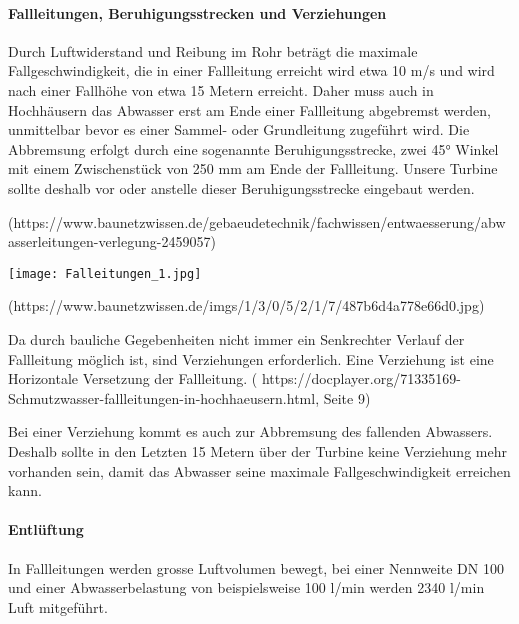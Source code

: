 \paragraph{Fallleitungen, Beruhigungsstrecken und Verziehungen}

Durch Luftwiderstand und Reibung im Rohr beträgt die maximale Fallgeschwindigkeit, die in einer Fallleitung erreicht wird etwa 10 m/s und wird nach einer Fallhöhe von etwa 15 Metern erreicht. Daher muss auch in Hochhäusern das Abwasser erst am Ende einer Fallleitung abgebremst werden, unmittelbar bevor es einer Sammel- oder Grundleitung zugeführt wird. Die Abbremsung erfolgt durch eine sogenannte Beruhigungsstrecke, zwei 45° Winkel mit einem Zwischenstück von 250 mm am Ende der Fallleitung. Unsere Turbine sollte deshalb vor oder anstelle dieser Beruhigungsstrecke eingebaut werden.

(https://www.baunetzwissen.de/gebaeudetechnik/fachwissen/entwaesserung/abwasserleitungen-verlegung-2459057)



\begin{center}

\texttt{[image: Falleitungen\_1.jpg]}

\end{center}

(https://www.baunetzwissen.de/imgs/1/3/0/5/2/1/7/487b6d4a778e66d0.jpg)



Da durch bauliche Gegebenheiten nicht immer ein Senkrechter Verlauf der Fallleitung möglich ist, sind Verziehungen erforderlich. Eine Verziehung ist eine Horizontale Versetzung der Fallleitung. ( https://docplayer.org/71335169-Schmutzwasser-fallleitungen-in-hochhaeusern.html, Seite 9)

Bei einer Verziehung kommt es auch zur Abbremsung des fallenden Abwassers. Deshalb sollte in den Letzten 15 Metern über der Turbine keine Verziehung mehr vorhanden sein, damit das Abwasser seine maximale Fallgeschwindigkeit erreichen kann.



\paragraph{Entlüftung}

In Fallleitungen werden grosse Luftvolumen bewegt, bei einer Nennweite DN 100 und einer Abwasserbelastung von beispielsweise 100 l/min werden 2340 l/min Luft mitgeführt.





